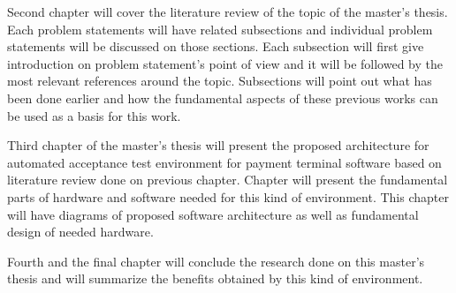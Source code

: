 Second chapter will cover the literature review of the topic of the master's thesis. Each problem statements will have related subsections and individual problem statements will be discussed on those sections. Each subsection will first give introduction on problem statement's point of view and it will be followed by the most relevant references around the topic. Subsections will point out what has been done earlier and how the fundamental aspects of these previous works can be used as a basis for this work.

Third chapter of the master's thesis will present the proposed architecture for automated acceptance test environment for payment terminal software based on literature review done on previous chapter. Chapter will present the fundamental parts of hardware and software needed for this kind of environment. This chapter will have diagrams of proposed software architecture as well as fundamental design of needed hardware.

Fourth and the final chapter will conclude the research done on this master's thesis and will summarize the benefits obtained by this kind of environment.

